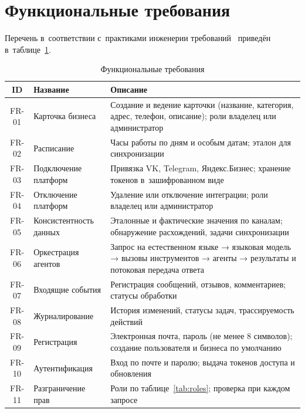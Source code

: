 
\section{Функциональные требования}
\label{sec:functional}

Перечень  в~соответствии с~практиками инженерии требований~\cite{src:8} приведён в~таблице~\ref{tab:fr}.

\begin{table}[H]
  \caption{Функциональные требования}
  \label{tab:fr}
  \small
  \begin{tabularx}{\textwidth}{|c|p{3.2cm}|X|}
    \hline
    \textbf{ID} & \textbf{Название} & \textbf{Описание} \\
    \hline
    FR-01 & Карточка бизнеса & Создание и ведение карточки (название, категория, адрес, телефон, описание); роли владелец или администратор \\
    \hline
    FR-02 & Расписание & Часы работы по дням и особым датам; эталон для синхронизации \\
    \hline
    FR-03 & Подключение платформ & Привязка VK, Telegram, Яндекс.Бизнес; хранение токенов в~зашифрованном виде \\
    \hline
    FR-04 & Отключение платформ & Удаление или отключение интеграции; роли владелец или администратор \\
    \hline
    FR-05 & Консистентность данных & Эталонные и фактические значения по каналам; обнаружение расхождений, задачи синхронизации \\
    \hline
    FR-06 & Оркестрация агентов & Запрос на естественном языке → языковая модель → вызовы инструментов → агенты → результаты и потоковая передача ответа \\
    \hline
    FR-07 & Входящие события & Регистрация сообщений, отзывов, комментариев; статусы обработки \\
    \hline
    FR-08 & Журналирование & История изменений, статусы задач, трассируемость действий \\
    \hline
    FR-09 & Регистрация & Электронная почта, пароль (не менее 8 символов); создание пользователя и бизнеса по умолчанию \\
    \hline
    FR-10 & Аутентификация & Вход по почте и паролю; выдача токенов доступа и обновления \\
    \hline
    FR-11 & Разграничение прав & Роли по таблице~\ref{tab:roles}; проверка при каждом запросе \\
    \hline
  \end{tabularx}
\end{table}
